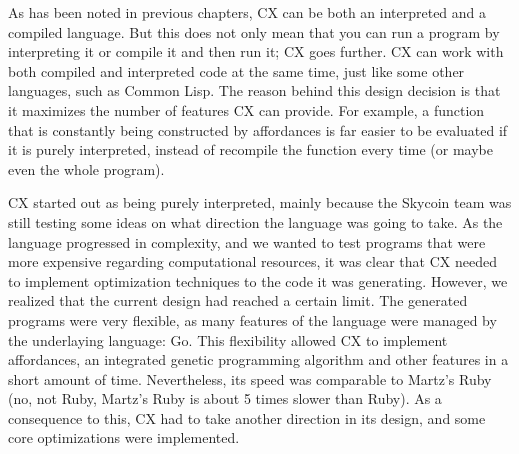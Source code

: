 \documentclass[11pt,fleqn,openany]{book} %
\begin{document}

As has been noted in previous chapters, CX can be both an interpreted and a compiled language. But this does not only mean that you can run a program by interpreting it or compile it and then run it; CX goes further. CX can work with both compiled and interpreted code at the same time, just like some other languages, such as Common Lisp. The reason behind this design decision is that it maximizes the number of features CX can provide. For example, a function that is constantly being constructed by affordances is far easier to be evaluated if it is purely interpreted, instead of recompile the function every time (or maybe even the whole program).

CX started out as being purely interpreted, mainly because the Skycoin team was still testing some ideas on what direction the language was going to take. As the language progressed in complexity, and we wanted to test programs that were more expensive regarding computational resources, it was clear that CX needed to implement optimization techniques to the code it was generating. However, we realized that the current design had reached a certain limit. The generated programs were very flexible, as many features of the language were managed by the underlaying language: Go. This flexibility allowed CX to implement affordances, an integrated genetic programming algorithm and other features in a short amount of time. Nevertheless, its speed was comparable to Martz's Ruby (no, not Ruby, Martz's Ruby is about 5 times slower than Ruby). As a consequence to this, CX had to take another direction in its design, and some core optimizations were implemented.
\end{document}
